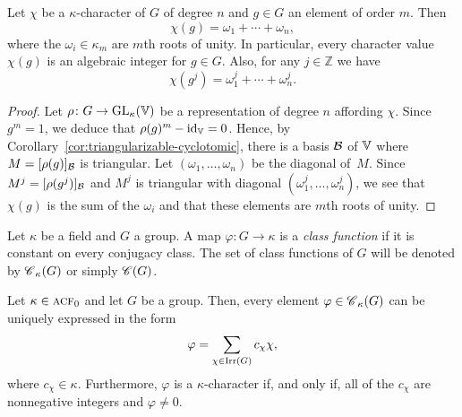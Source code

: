 \begin{prop}\label{prop:cyclotomic-sum}
    Let\/ $\chi$ be a $\kappa$-character of\/ $G$ of degree\/ $n$ and\/ $g\in G$ an element of order\/ $m$. Then
    $$
        \chi(g) = \omega_1 + \cdots + \omega_n,
    $$
    where the\/ $\omega_i\in\kappa_m$ are $m$th roots of unity. In particular, every character value\/ $\chi(g)$ is an algebraic integer for $g\in G$. Also, for any\/ $j \in \mathbb{Z}$ we have
    $$
    \chi(g^j) = \omega_1^j + \cdots + \omega_n^j.
    $$
\end{prop}

\begin{proof}
    Let $\rho\colon G\to{\rm GL}_\kappa(\mathbb V)$ be a representation of degree $n$ affording $\chi$. Since $g^m=1$, we deduce that $\rho(g)^m-\operatorname{id}_\mathbb V=0$. Hence, by Corollary~\ref{cor:triangularizable-cyclotomic}, there is a basis $\mathcal B$ of $\mathbb V$ where $M=[\rho(g)]_{\mathcal B}$ is triangular. Let $(\omega_1,\dots,\omega_n)$ be the diagonal of~$M$. Since $M^j=[\rho(g^j)]_{\mathcal B}$ and $M^j$ is triangular with diagonal $(\omega_1^j,\dots,\omega_n^j)$, we see that $\chi(g)$ is the sum of the $\omega_i$ and that these elements are $m$th roots of unity.
    
\end{proof}

\begin{defn}
    Let $\kappa$ be a field and $G$ a group. A map $\varphi\colon G\to\kappa$ is a \textsl{class function} if it is constant on every conjugacy class. The set of class functions of $G$ will be denoted by $\operatorname{\mathscr C}_\kappa(G)$ or simply $\operatorname{\mathscr C}(G)$.
\end{defn}

\begin{thm}\label{thm:character-basis}
    Let $\kappa\in\operatorname{\textnormal{\textsc{acf}}}_0$ and let $G$ be a group. Then, every element $\varphi\in\operatorname{\mathscr C}_\kappa(G)$ can be uniquely expressed in the form
    $$
    \varphi = \sum_{\chi\in\operatorname{Irr}(G)}c_\chi\chi,
    $$
    where\/ $c_\chi\in\kappa$. Furthermore, $\varphi$ is a $\kappa$-character if, and only if, all of the\/ $c_\chi$ are nonnegative integers and\/ $\varphi\ne0$.
\end{thm}

